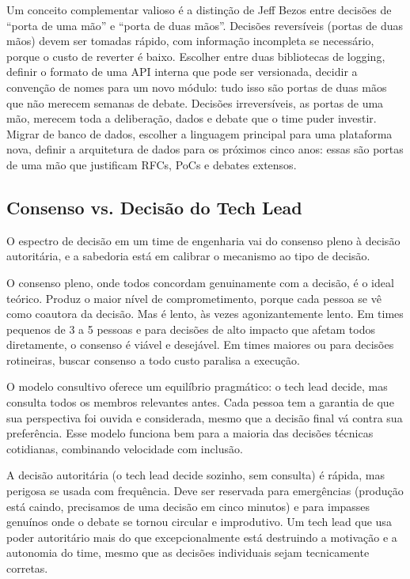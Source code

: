Um conceito complementar valioso é a distinção de Jeff Bezos entre decisões
de ``porta de uma mão'' e ``porta de duas mãos''. Decisões reversíveis
(portas de duas mãos) devem ser tomadas rápido, com informação incompleta
se necessário, porque o custo de reverter é baixo. Escolher entre duas
bibliotecas de logging, definir o formato de uma API interna que pode ser
versionada, decidir a convenção de nomes para um novo módulo: tudo isso são
portas de duas mãos que não merecem semanas de debate. Decisões irreversíveis,
as portas de uma mão, merecem toda a deliberação, dados e debate que o time
puder investir. Migrar de banco de dados, escolher a linguagem principal para
uma plataforma nova, definir a arquitetura de dados para os próximos cinco
anos: essas são portas de uma mão que justificam RFCs, PoCs e debates
extensos.

\subsection{Consenso vs. Decisão do Tech Lead}

O espectro de decisão em um time de engenharia vai do consenso pleno à
decisão autoritária, e a sabedoria está em calibrar o mecanismo ao tipo de
decisão.

O consenso pleno, onde todos concordam genuinamente com a decisão, é o ideal
teórico. Produz o maior nível de comprometimento, porque cada pessoa se vê
como coautora da decisão. Mas é lento, às vezes agonizantemente lento. Em
times pequenos de 3 a 5 pessoas e para decisões de alto impacto que afetam
todos diretamente, o consenso é viável e desejável. Em times maiores ou para
decisões rotineiras, buscar consenso a todo custo paralisa a execução.

O modelo consultivo oferece um equilíbrio pragmático: o tech lead decide,
mas consulta todos os membros relevantes antes. Cada pessoa tem a garantia
de que sua perspectiva foi ouvida e considerada, mesmo que a decisão final
vá contra sua preferência. Esse modelo funciona bem para a maioria das
decisões técnicas cotidianas, combinando velocidade com inclusão.

A decisão autoritária (o tech lead decide sozinho, sem consulta) é
rápida, mas perigosa se usada com frequência. Deve ser reservada para
emergências (produção está caindo, precisamos de uma decisão em cinco
minutos) e para impasses genuínos onde o debate se tornou circular e
improdutivo. Um tech lead que usa poder autoritário mais do que
excepcionalmente está destruindo a motivação e a autonomia do time, mesmo
que as decisões individuais sejam tecnicamente corretas.

